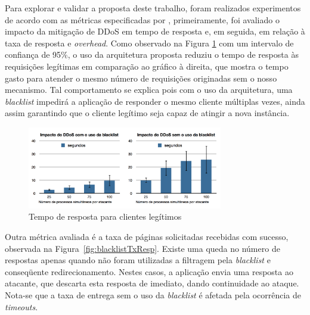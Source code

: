 


Para explorar e validar a proposta deste trabalho, foram realizados experimentos de acordo com as métricas especificadas por \cite{4600003}, primeiramente, foi avaliado o impacto da mitigação de DDoS em tempo de resposta e, em seguida, em relação à taxa de resposta e \emph{overhead}. 
%
%
Como observado na Figura \ref{fig:blacklistSecs} com um intervalo de confiança de 95\%, o uso da arquitetura proposta reduziu o tempo de resposta às requisições legítimas em comparação ao gráfico à direita, que mostra o tempo gasto para atender o mesmo número de requisições originadas sem o nosso mecanismo. Tal comportamento se explica pois com o uso da arquitetura, uma \emph{blacklist} impedirá a aplicação de responder o mesmo cliente múltiplas vezes, ainda assim garantindo que o cliente legítimo seja capaz de atingir a nova instância.

\begin{figure}[h!]
\centering
\includegraphics[width=0.76\textwidth]{images/blacklistSecs.png}
\caption{Tempo de resposta para clientes legítimos}
\label{fig:blacklistSecs}
\end{figure}




Outra métrica avaliada é a taxa de páginas solicitadas recebidas com sucesso, observada na Figura~\ref{fig:blacklistTxResp}. Existe uma queda no número de respostas apenas quando não foram utilizadas a filtragem pela \emph{blacklist} e conseqüente redirecionamento. Nestes casos, a aplicação envia uma resposta ao atacante, que descarta esta resposta de imediato, dando continuidade ao ataque. Nota-se que a taxa de entrega sem o uso da \emph{blacklist} é afetada pela ocorrência de \emph{timeouts}.


